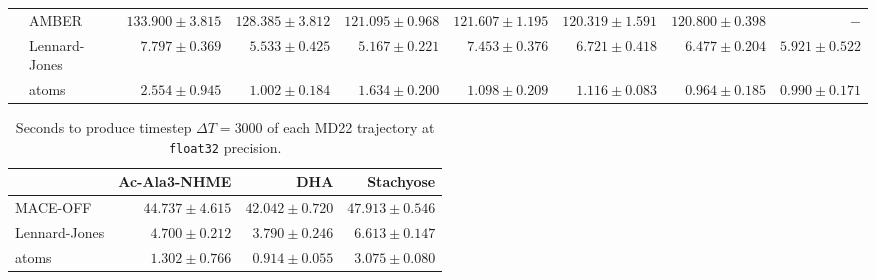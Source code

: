 \begin{table}[H]
{\begin{tabular}{llrrrrrrr}
              &   AMBER
              & \(133.900\pm\scriptstyle{3.815}\) 
              & \(128.385\pm\scriptstyle{3.812}\) 
              & \(121.095\pm\scriptstyle{0.968}\) 
              & \(121.607\pm\scriptstyle{1.195}\) 
              & \(120.319\pm\scriptstyle{1.591}\) 
              & \(120.800\pm\scriptstyle{0.398}\) 
              & \(-\) \\
            
              & Lennard-Jones
              & \(7.797\pm\scriptstyle{0.369}\) 
              & \(5.533\pm\scriptstyle{0.425}\) 
              & \(5.167\pm\scriptstyle{0.221}\) 
              & \(7.453\pm\scriptstyle{0.376}\) 
              & \(6.721\pm\scriptstyle{0.418}\) 
              & \(6.477\pm\scriptstyle{0.204}\) 
              & \(5.921\pm\scriptstyle{0.522}\) \\
    
              & \gls{atoms}
              & \(2.554\pm\scriptstyle{0.945}\) 
              & \(1.002\pm\scriptstyle{0.184}\) 
              & \(1.634\pm\scriptstyle{0.200}\) 
              & \(1.098\pm\scriptstyle{0.209}\) 
              & \(1.116\pm\scriptstyle{0.083}\) 
              & \(0.964\pm\scriptstyle{0.185}\) 
              & \(0.990\pm\scriptstyle{0.171}\) \\
            \bottomrule
        \end{tabular}
    }
\end{table}

\begin{table}[H]
    \centering
    \caption{Seconds to produce timestep \(\Delta T = 3000\) of each MD22 trajectory at \texttt{float32} precision.}
    \label{tab:equivariance_defect}
        \begin{tabular}{lrrr}
            \toprule
             & Ac-Ala3-NHME & DHA & Stachyose \\
            \midrule 
            MACE-OFF & \(44.737\pm\scriptstyle{4.615}\) & \(42.042\pm\scriptstyle{0.720}\) & \(47.913\pm\scriptstyle{0.546}\) \\
            
            Lennard-Jones & \(4.700\pm\scriptstyle{0.212}\) & \(3.790\pm\scriptstyle{0.246}\) & \(6.613\pm\scriptstyle{0.147}\) \\
    
            \gls{atoms} & \(1.302\pm\scriptstyle{0.766}\) & \(0.914\pm\scriptstyle{0.055}\) & \(3.075\pm\scriptstyle{0.080}\) \\
            \bottomrule
        \end{tabular}
\end{table}

